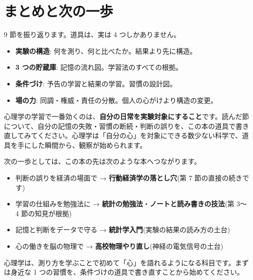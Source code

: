 \documentclass{article}
\begin{document}
\section{まとめと次の一歩}

9 節を振り返ります。道具は、実は 4 つしかありません。

\begin{itemize}
\item \textbf{実験の構造}: 何を測り、何と比べたか。結果より先に構造。
\item \textbf{3 つの貯蔵庫}: 記憶の流れ図。学習法のすべての根拠。
\item \textbf{条件づけ}: 予告の学習と結果の学習。習慣の設計図。
\item \textbf{場の力}: 同調・権威・責任の分散。個人の心がけより構造の変更。
\end{itemize}

心理学の学習で一番効くのは、\textbf{自分の日常を実験対象にすること}です。読んだ節について、自分の記憶の失敗・習慣の断続・判断の誤りを、この本の道具で書き直してみてください。心理学は「自分の心」を対象にできる数少ない科学で、道具を手にした瞬間から、観察が始められます。

次の一歩としては、この本の先は次のような本へつながります。

\begin{itemize}
\item 判断の誤りを経済の場面で → \textbf{行動経済学の落とし穴}(第 7 節の直接の続きです)
\item 学習の仕組みを勉強法に → \textbf{統計の勉強法}・\textbf{ノートと読み書きの技法}(第 3〜4 節の知見が根拠)
\item 記憶と判断をデータで守る → \textbf{統計学入門}(実験の結果の読み方の土台)
\item 心の働きを脳の物理で → \textbf{高校物理やり直し}(神経の電気信号の土台)
\end{itemize}

心理学は、測り方を学ぶことで初めて「心」を語れるようになる科目です。まずは身近な 1 つの習慣を、条件づけの道具で書き直すことから始めてください。
\end{document}

